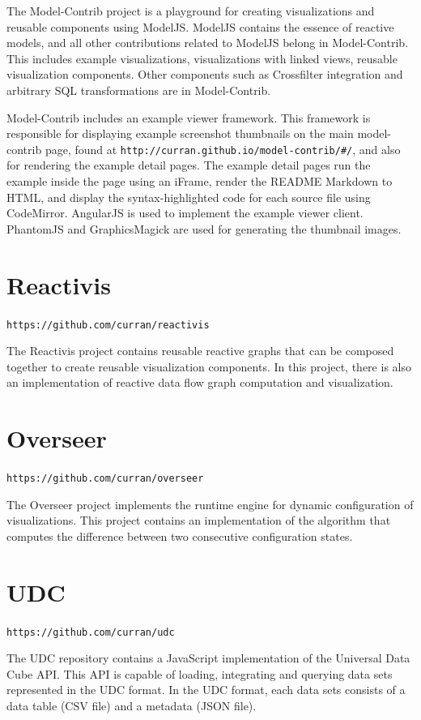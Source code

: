 \documentclass{umthesis}          %
\begin{document}
The Model-Contrib project is a playground for creating visualizations and reusable components using ModelJS. ModelJS contains the essence of reactive models, and all other contributions related to ModelJS belong in Model-Contrib. This includes example visualizations, visualizations with linked views, reusable visualization components. Other components such as Crossfilter integration and arbitrary SQL transformations are in Model-Contrib.

Model-Contrib includes an example viewer framework. This framework is responsible for displaying example screenshot thumbnails on the main model-contrib page, found at \verb`http://curran.github.io/model-contrib/#/`, and also for rendering the example detail pages. The example detail pages run the example inside the page using an iFrame, render the README Markdown to HTML, and display the syntax-highlighted code for each source file using CodeMirror. AngularJS is used to implement the example viewer client. PhantomJS and GraphicsMagick are used for generating the thumbnail images.

\section{Reactivis}
\verb`https://github.com/curran/reactivis`

The Reactivis project contains reusable reactive graphs that can be composed together to create reusable visualization components. In this project, there is also an implementation of reactive data flow graph computation and visualization.

\section{Overseer}
\verb`https://github.com/curran/overseer`

The Overseer project implements the runtime engine for dynamic configuration of visualizations. This project contains an implementation of the algorithm that computes the difference between two consecutive configuration states.

\section{UDC}
\verb`https://github.com/curran/udc`

The UDC repository contains a JavaScript implementation of the Universal Data Cube API. This API is capable of loading, integrating and querying data sets represented in the UDC format. In the UDC format, each data sets consists of a data table (CSV file) and a metadata (JSON file).
\end{document}
